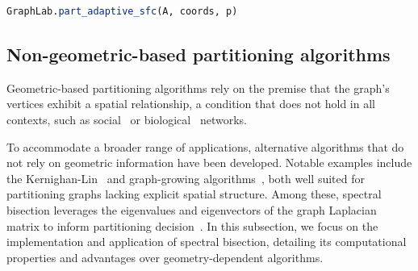     \begin{lstlisting}[language=Julia]
    GraphLab.part_adaptive_sfc(A, coords, p)
    \end{lstlisting}

    
    
    
    

    \subsection{Non-geometric-based partitioning algorithms}
    \label{subsec:non-geo}
    Geometric-based partitioning algorithms
    rely on the premise that the graph's vertices exhibit a spatial relationship, a condition that does not
    hold in all contexts, such as social~\cite{Newman_2013} or biological~\cite{10.1093/nar/gkx1313} networks.
    
    To accommodate a broader range of applications, alternative algorithms that do not rely on geometric information
    have been developed. Notable examples include the Kernighan-Lin~\cite{6771089} and graph-growing algorithms~\cite{doi:10.1137/S1064827595287997},
    both well suited for partitioning graphs lacking explicit spatial structure.
    Among these, spectral bisection leverages
    the eigenvalues and eigenvectors of the graph Laplacian matrix to inform partitioning decision~\cite{fiedler75}.
    In this subsection, we focus
    on the implementation and application of spectral bisection, detailing its computational properties and advantages over geometry-dependent algorithms.
